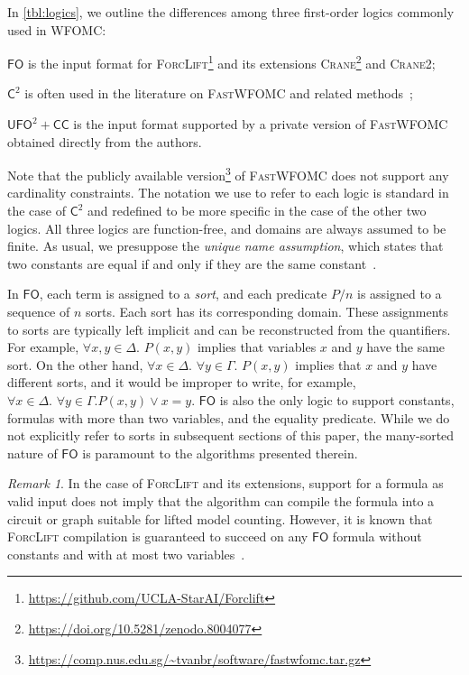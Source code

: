 \documentclass[letterpaper]{article} %
\theoremstyle{remark}
\newtheorem*{remark}{Remark}
\theoremstyle{definition}
\newcommand{\Ctwo}{$\mathsf{C}^{2}$}
\newcommand{\FO}{$\mathsf{FO}$}
\newcommand{\UFO}{$\mathsf{UFO}^{2} + \mathsf{CC}$}
\newcommand{\Cranetwo}{\textsc{Crane2}}
\begin{document}
In \cref{tbl:logics}, we outline the differences among three first-order logics
commonly used in WFOMC:
\begin{enumerate*}[label=(\roman*)]
  \item \FO{} is the input format for
  \textsc{ForcLift}\footnote{\url{https://github.com/UCLA-StarAI/Forclift}} and
  its extensions
  \textsc{Crane}\footnote{\url{https://doi.org/10.5281/zenodo.8004077}} and
  \Cranetwo{};
  \item \Ctwo{} is often used in the literature on \textsc{FastWFOMC} and
  related
  methods~\cite{DBLP:journals/jair/Kuzelka21,DBLP:conf/aaai/MalhotraS22};
  \item \UFO{} is the input format supported by a private version of
  \textsc{FastWFOMC} obtained directly from the authors.
\end{enumerate*}
Note that the publicly available
version\footnote{\url{https://comp.nus.edu.sg/~tvanbr/software/fastwfomc.tar.gz}}
of \textsc{FastWFOMC} does not support any cardinality constraints. The notation
we use to refer to each logic is standard in the case of \Ctwo{} and redefined
to be more specific in the case of the other two logics. All three logics are
function-free, and domains are always assumed to be finite. As usual, we
presuppose the \emph{unique name assumption}, which states that two constants
are equal if and only if they are the same constant~\cite{DBLP:books/aw/RN2020}.

\renewcommand*{\thefootnote}{\arabic{footnote}}

In \FO{}, each term is assigned to a \emph{sort}, and each predicate $P/n$ is
assigned to a sequence of $n$ sorts. Each sort has its corresponding domain.
These assignments to sorts are typically left implicit and can be reconstructed
from the quantifiers. For example, $\forall x,y \in \Delta\text{. }P(x, y)$
implies that variables $x$ and $y$ have the same sort. On the other hand,
$\forall x \in \Delta\text{. }\forall y \in \Gamma\text{. } P(x, y)$ implies
that $x$ and $y$ have different sorts, and it would be improper to write, for
example, $\forall x \in \Delta\text{. }\forall y \in \Gamma\text{.
} P(x, y) \lor x = y$. \FO{} is also the only logic to support constants,
formulas with more than two variables, and the equality predicate. While we do
not explicitly refer to sorts in subsequent sections of this paper, the
many-sorted nature of \FO{} is paramount to the algorithms presented therein.

\begin{remark}
  In the case of \textsc{ForcLift} and its extensions, support for a formula as
  valid input does not imply that the algorithm can compile the formula into a
  circuit or graph suitable for lifted model counting. However, it is known that
  \textsc{ForcLift} compilation is guaranteed to succeed on any \FO{} formula
  without constants and with at most two
  variables~\cite{DBLP:conf/nips/Broeck11,DBLP:conf/kr/BroeckMD14}.
\end{remark}
\end{document}
